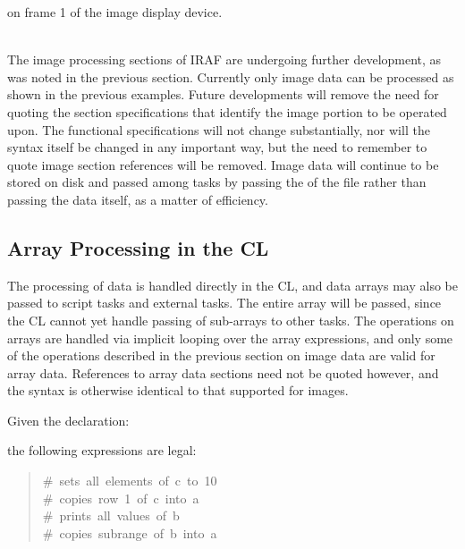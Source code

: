 \begin{quotation}\noindent
{} 
\end{quotation}

\noindent
on frame 1 of the image display device.

 \\
The image processing sections of IRAF are undergoing further development,
as was noted in the previous section.  Currently only image data
can be processed as shown in the previous examples.  Future developments
will remove the need for quoting the section specifications that identify
the image portion to be operated upon.  The functional specifications
will not change substantially, nor will the syntax itself be changed
in any important way, but the need to remember to quote image section
references will be removed.  Image data will continue to be
stored on disk and passed among tasks by passing the 
of the file rather than passing the data itself, as a matter of efficiency.

\subsection{Array Processing in the CL}

The processing of  data is handled directly in the CL, 
and data arrays may also be passed to script tasks and external tasks.  The
entire array will be passed, since the CL cannot yet handle passing of 
sub-arrays to other tasks.  The operations on arrays are handled via
implicit looping over the array expressions, and only some of the
operations described in the previous section on image data are valid
for array data.  References to array data sections need not be quoted
however, and the syntax is otherwise identical to that supported for
images.

Given the declaration:

\begin{quotation}\noindent
{} 
\end{quotation}

\noindent
the following expressions are legal:

\begin{quotation}\noindent
{}  \hfill \#~sets~all~elements~of~c~to~10 \\
  \hfill \#~copies~row~1~of~c~into~a \\
  \hfill \#~prints~all~values~of~b \\
  \hfill \#~copies~subrange~of~b~into~a \\
 
\end{quotation}

